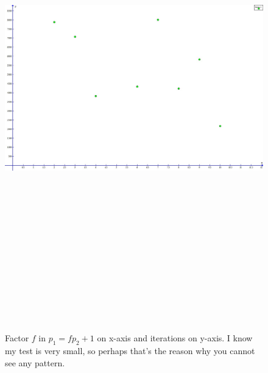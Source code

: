 \documentclass[11pt,twoside]{article}
\begin{document}
\newpage
\begin{figure}
    \centering
    \includegraphics[angle=90, height=210mm]{sgt-factors}
    \caption{Factor $f$ in $p_{1}=fp_{2}+1$ on x-axis and iterations on y-axis. I know my test is very small, so perhaps that's the reason why you cannot see any pattern.}
\end{figure}
\end{document}

